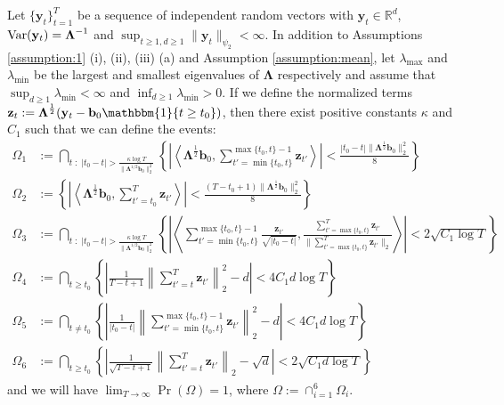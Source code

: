 \begin{lemma}\label{lemma:thm1-event-bound}

Let $\{\mathbf{y}_t\}_{t=1}^T$ be a sequence of independent random vectors with $\mathbf{y}_t \in \mathbb{R}^d$, $\normalfont{\text{Var}}(\mathbf{y}_t) = \boldsymbol{\Lambda}^{-1}$ and $\sup_{t\geq 1, d\geq 1} \lVert \mathbf{y}_t\rVert_{\psi_2} < \infty$. In addition to Assumptions \ref{assumption:1} (i), (ii), (iii) (a) and Assumption \ref{assumption:mean}, let $\lambda_{\max}$ and $\lambda_{\min}$ be the largest and smallest eigenvalues of $\boldsymbol{\Lambda}$ respectively and assume that $\sup_{d\geq 1} \lambda_{\min} < \infty$ and $\inf_{d\geq 1} \lambda_{\min} > 0$. If we define the normalized terms $\mathbf{z}_t := \boldsymbol{\Lambda}^{\frac{1}{2}}(\mathbf{y}_t - \mathbf{b}_0\mathbbm{1}\{t\geq t_0\})$, then there exist positive constants $\kappa$ and $C_1$ such that we can define the events:
\begin{align*}
    \Omega_1 &:= \bigcap_{t \;:\; |t_0 - t| > \frac{\kappa \log T}{\lVert \boldsymbol{\Lambda}^{1/2}\mathbf{b}_0\rVert_2^2}} \left\{ 
    \left|\left\langle\boldsymbol{\Lambda}^{\frac{1}{2}}\mathbf{b}_0, \sum_{t'=\min\{t_0,t\}}^{\max\{t_0,t\}-1}\mathbf{z}_{t'} \right\rangle\right| < \frac{|t_0-t| \lVert\boldsymbol{\Lambda}^{\frac{1}{2}} \mathbf{b}_0\rVert_2^2}{8}\right\} \\
    \Omega_2 &:= \left\{\left|\left\langle \boldsymbol{\Lambda}^{\frac{1}{2}}\mathbf{b}_0, \sum_{t'=t_0}^T\mathbf{z}_{t'}\right\rangle\right| < \frac{(T-t_0+1) \lVert\boldsymbol{\Lambda}^{\frac{1}{2}} \mathbf{b}_0\rVert_2^2}{8} \right\} \\
    \Omega_3 &:=  \bigcap_{t \;:\; |t_0 - t| > \frac{\kappa \log T}{\lVert \boldsymbol{\Lambda}^{1/2}\mathbf{b}_0\rVert_2^2}} \left\{\left|\left\langle \sum_{t'=\min\{t_0,t\}}^{\max\{t_0,t\}-1}\frac{\mathbf{z}_{t'}}{\sqrt{|t_0-t|}}, \frac{\sum_{t'=\max\{t_0,t\}}^{T}\mathbf{z}_{t'}}{\lVert\sum_{t'=\max\{t_0,t\}}^{T}\mathbf{z}_{t'}\rVert_2}\right\rangle\right| < 2\sqrt{C_1\log T}\right\} \\
    \Omega_4 &:= \bigcap_{t \geq t_0} \left\{\left|\frac{1}{T-t+1}\left\lVert\sum_{t'=t}^T \mathbf{z}_{t'}\right\rVert_2^2 -d \right| < 4 C_1 d \log T \right\} \\
    \Omega_5 &:= \bigcap_{t\neq t_0} \left\{\left|\frac{1}{|t_0 - t|}\left\lVert\sum_{t'=\min\{t_0,t\}}^{\max\{t_0,t\}-1} \mathbf{z}_{t'}\right\rVert_2^2 -d \right| < 4 C_1 d \log T \right\} \\
    \Omega_6 &:= \bigcap_{t\geq t_0} \left\{\left|\frac{1}{\sqrt{T-t+1}}\left\lVert\sum_{t'=t}^T \mathbf{z}_{t'}\right\rVert_2 -\sqrt{d} \right| < 2\sqrt{C_1d \log T} \right\} 
\end{align*}
and we will have $\lim_{T\to\infty} \Pr(\Omega) = 1$, where $\Omega := \cap_{i=1}^6 \Omega_i$.

\end{lemma}

